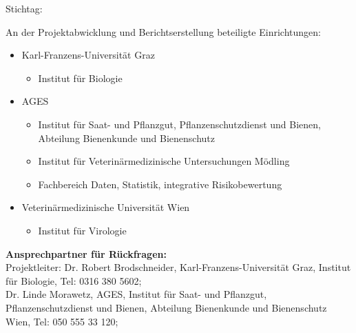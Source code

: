 \begin{center}
    \textbf{\mysubject} \par
    Stichtag: \mydeadlinedate
\end{center}

An der Projektabwicklung und Berichtserstellung beteiligte Einrichtungen:

\begin{itemize}
    \item  Karl-Franzens-Universität Graz
    \begin{itemize}
        \item  Institut für Biologie
    \end{itemize}
    \item  AGES
    \begin{itemize}
        \item  Institut für Saat- und Pflanzgut, Pflanzenschutzdienst und Bienen, Abteilung Bienenkunde und Bienenschutz
        \item Institut für Veterinärmedizinische Untersuchungen Mödling
        \item Fachbereich Daten, Statistik, integrative Risikobewertung
    \end{itemize}
    \item Veterinärmedizinische Universität Wien
    \begin{itemize}
        \item Institut für Virologie
    \end{itemize}
\end{itemize}

\vfill\vfill

\textbf{Ansprechpartner für Rückfragen:}
\\

Projektleiter: Dr. Robert Brodschneider, Karl-Franzens-Universität Graz, Institut für Biologie, Tel: 0316 380 5602; 
\\

Dr. Linde Morawetz, AGES, Institut für Saat- und Pflanzgut, Pflanzenschutzdienst und Bienen, Abteilung Bienenkunde und Bienenschutz Wien, Tel: 050 555 33 120; 
%
